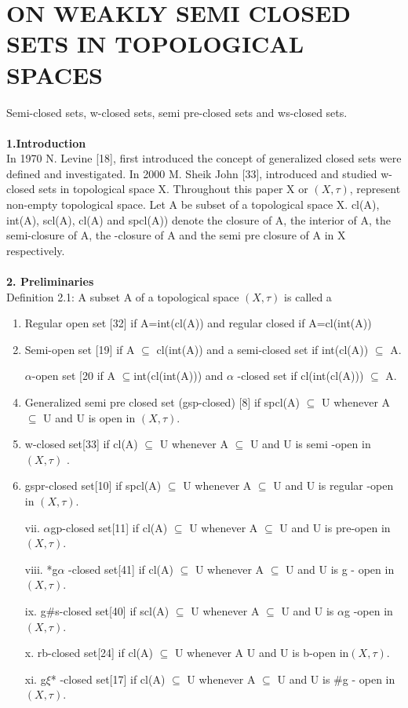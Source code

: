 \chapter{ON WEAKLY SEMI CLOSED SETS IN TOPOLOGICAL SPACES}
\graphicspath{{Chapter1/Chapter1Figs/EPS/}{Chapter1/Chapter1Figs/}}

 Semi-closed sets, w-closed sets, semi pre-closed sets and ws-closed sets.\\\\\textbf{1.Introduction}\\\indent In 1970 N. Levine [18], first introduced the concept of generalized closed sets were defined and investigated. In 2000 M. Sheik John [33], introduced and studied w-closed sets in topological space X. Throughout this paper X or  $(X,\tau)$, represent non-empty topological space. Let A be subset of a topological space X. cl(A), int(A), scl(A),  cl(A) and spcl(A)) denote the closure of A, the interior of A, the semi-closure of A, the  -closure of A and the semi pre closure of A  in X respectively.\\
	\\\textbf{2. Preliminaries}\\Definition 2.1:  A subset A of a topological space $(X,\tau)$ is called a
	\begin{enumerate}[1.2.1]
		\item{} Regular open set [32] if A=int(cl(A)) and regular closed if A=cl(int(A))
		\item{}  Semi-open set [19] if A  $\subseteq$ cl(int(A)) and a semi-closed set if int(cl(A))  $\subseteq$ A.
		\item[{}  $\alpha$-open set [20] if A  $\subseteq$int(cl(int(A))) and $\alpha$  -closed set if cl(int(cl(A))) $\subseteq$ A.
		\item{}  Generalized semi pre closed set (gsp-closed) [8] if spcl(A)  $\subseteq$ U whenever A $\subseteq$  U  and U is open in $(X,\tau)$.
		\item{}  w-closed set[33] if cl(A) $\subseteq$  U whenever A $\subseteq$  U and U   is semi -open in $(X,\tau)$ .
		\item{}gspr-closed set[10] if spcl(A)  $\subseteq$ U whenever A $\subseteq$  U and U   is regular -open in $(X,\tau)$.
		\item[vii.]  $\alpha$gp-closed set[11] if cl(A)  $\subseteq$ U whenever A $\subseteq$  U and U   is pre-open in $(X,\tau)$.
		\item[viii.]  *g$\alpha$ -closed set[41] if cl(A) $\subseteq$  U whenever A $\subseteq$  U   and U  is  g  - open in $(X,\tau)$.
		\item[ix.]  g$\#$s-closed set[40] if scl(A) $\subseteq$  U whenever A $\subseteq$  U and U   is $\alpha$g -open in $(X,\tau)$.
		\item[x.]  rb-closed set[24] if cl(A) $\subseteq$  U whenever A   U and U   is  b-open in$(X,\tau)$.
		\item[xi.]  g$\xi$* -closed set[17] if   cl(A) $\subseteq$   U whenever A $\subseteq$  U and U  is  $\#$g - open in $(X,\tau)$.
	\end{enumerate}
